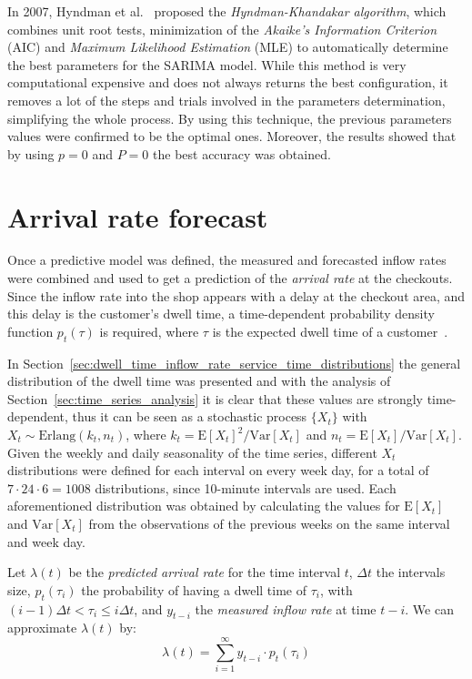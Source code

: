 In 2007, Hyndman et al.~\cite{hyndman2007} proposed the \emph{Hyndman-Khandakar algorithm}, which combines unit root tests, minimization of the \emph{Akaike’s Information Criterion} (AIC) and \emph{Maximum Likelihood Estimation} (MLE) to automatically determine the best parameters for the SARIMA model. While this method is very computational expensive and does not always returns the best configuration, it removes a lot of the steps and trials involved in the parameters determination, simplifying the whole process. By using this technique, the previous parameters values were confirmed to be the optimal ones. Moreover, the results showed that by using \( p = 0 \) and \( P = 0 \) the best accuracy was obtained.

\section{Arrival rate forecast}
\label{sec:arrival_rate_forecast}

Once a predictive model was defined, the measured and forecasted inflow rates were combined and used to get a prediction of the \emph{arrival rate} at the checkouts. Since the inflow rate into the shop appears with a delay at the checkout area, and this delay is the customer's dwell time, a time-dependent probability density function \( p_t(\tau) \) is required, where \( \tau \) is the expected dwell time of a customer~\cite{aksu}.

In Section~\ref{sec:dwell_time_inflow_rate_service_time_distributions} the general distribution of the dwell time was presented and with the analysis of Section~\ref{sec:time_series_analysis} it is clear that these values are strongly time-dependent, thus it can be seen as a stochastic process \( \{ X_t \} \) with \( X_t \sim \text{Erlang}(k_t, n_t) \), where \( k_t = \text{E}[X_t]^2 / \text{Var}[X_t] \) and \( n_t =  \text{E}[X_t] / \text{Var}[X_t] \). Given the weekly and daily seasonality of the time series, different \( X_t \) distributions were defined for each interval on every week day, for a total of \( 7 \cdot 24 \cdot 6 = 1008 \) distributions, since 10-minute intervals are used. Each aforementioned distribution was obtained by calculating the values for \( \text{E}[X_t] \) and \( \text{Var}[X_t] \) from the observations of the previous weeks on the same interval and week day.

Let \( \lambda(t) \) be the \emph{predicted arrival rate} for the time interval \( t \), \( \Delta t \) the intervals size, \( p_t(\tau_i) \) the probability of having a dwell time of \( \tau_i \), with \( (i-1) \Delta t < \tau_i \leq i \Delta t \), and \( y_{t-i} \) the \emph{measured inflow rate} at time \( t-i \). We can approximate \( \lambda(t) \) by:
\begin{equation}
  \lambda(t) = \sum_{i=1}^{\infty} y_{t-i} \cdot p_t(\tau_i)
\end{equation}

